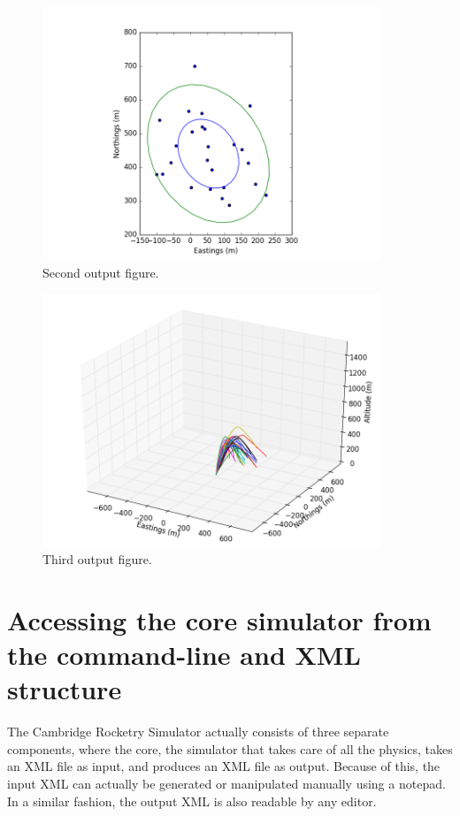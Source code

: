 \documentclass[11pt, a4paper]{article}
\begin{document}
\begin{figure}
  \centering
    \includegraphics[width=0.9\textwidth]{crs_3_output_2.png}
  \caption{Second output figure.}
  \label{fig:crs_32}
\end{figure}

\begin{figure}
  \centering
    \includegraphics[width=0.9\textwidth]{crs_3_output_3.png}
  \caption{Third output figure.}
  \label{fig:crs_33}
\end{figure}

\section{Accessing the core simulator from the command-line and XML structure}

The Cambridge Rocketry Simulator actually consists of three separate components, where the core, the simulator that takes care of all the physics, takes an XML file as input, and produces an XML file as output. Because of this, the input XML can actually be generated or manipulated manually using a notepad. In a similar fashion, the output XML is also readable by any editor.
\end{document}
